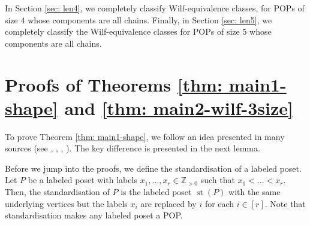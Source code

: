 \documentclass[12pt, english, a4paper]{article}
\newcommand{\blue}[1]{\textcolor{blue}{#1}}
\DeclareMathOperator{\st}{st}
\theoremstyle{plain}
\theoremstyle{definition}
\theoremstyle{remark}
\begin{document}
In Section \ref{sec: len4}, we completely classify Wilf-equivalence classes,
for POPs of size $4$ whose components are all chains. 
Finally, in Section \ref{sec: len5}, we completely classify the 
Wilf-equivalence classes for POPs of size $5$ whose 
components are all chains.

\section{Proofs of Theorems \ref{thm: main1-shape} and \ref{thm: main2-wilf-3size}}\label{sec: proofs}

To prove Theorem \ref{thm: main1-shape}, we follow an idea presented in many sources (see \cite{bwx-main}, \cite{baxter-shape-wilf-vincular}, \cite{baxter-even-perm}, \cite{burstein-shape-wilf}). The key difference is presented in the next lemma.  

Before we jump into the proofs, we define the standardisation of a labeled poset. Let $P$ be a labeled poset with labels $x_1,\dots,x_r\in \mathbb{Z}_{>0}$ such that $x_1<\dots<x_r$. Then, the standardisation of $P$ is the labeled poset $\st(P)$ with the same underlying vertices but the labels $x_i$ are replaced by $i$ for each $i\in [r]$. Note that standardisation makes any labeled poset a POP.
\end{document}
